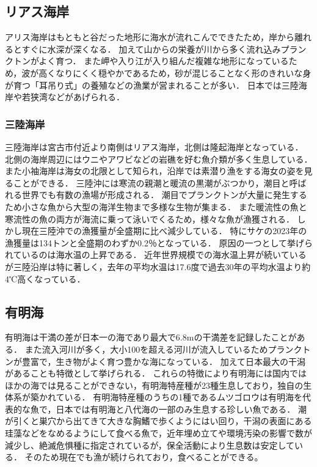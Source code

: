 \documentclass[12pt,a4j,titlepage]{ltjsarticle}
\begin{document}
\subsection{リアス海岸}
アリス海岸はもともと谷だった地形に海水が流れこんでできたため，岸から離れるとすぐに水深が深くなる．
加えて山からの栄養が川から多く流れ込みプランクトンがよく育つ．
また岬や入り江が入り組んだ複雑な地形になっているため，波が高くなりにくく穏やかであるため，砂が混じることなく形のきれいな身が育つ「耳吊り式」の養殖などの漁業が営まれることが多い．
日本では三陸海岸や若狭湾などがあげられる．
\subsubsection{三陸海岸}
三陸海岸は宮古市付近より南側はリアス海岸，北側は隆起海岸となっている\cite{sanriku}．
北側の海岸周辺にはウニやアワビなどの岩礁を好む魚介類が多く生息している．
また小袖海岸は海女の北限として知られ，沿岸では素潜り漁をする海女の姿を見ることができる．
三陸沖には寒流の親潮と暖流の黒潮がぶつかり，潮目と呼ばれる世界でも有数の漁場が形成される．
潮目でプランクトンが大量に発生するため小さな魚から大型の海洋生物まで多様な生物が集まる．
また暖流性の魚と寒流性の魚の両方が海流に乗って泳いでくるため，様々な魚が漁獲される．
しかし現在三陸沖での漁獲量が全盛期に比べ減少している．
特にサケの2023年の漁獲量は134トンと全盛期のわずか0.2％となっている．
原因の一つとして挙げられているのは海水温の上昇である．
近年世界規模での海水温上昇が続いているが三陸沿岸は特に著しく，去年の平均水温は17.6度で過去30年の平均水温より約4℃高くなっている．
\subsection{有明海}
有明海は干満の差が日本一の海であり最大で6.8mの干満差を記録したことがある\cite{ariake}．
また流入河川が多く，大小100を超える河川が流入しているためプランクトンが豊富で，生き物がよく育つ豊かな海になっている．
加えて日本最大の干潟があることも特徴として挙げられる．
これらの特徴により有明海には国内ではほかの海では見ることができない，有明海特産種が23種生息しており，独自の生体系が築かれている．
有明海特産種のうちの1種であるムツゴロウは有明海を代表的な魚で，日本では有明海と八代海の一部のみ生息する珍しい魚である．
潮が引くと巣穴から出てきて大きな胸鰭で歩くようにはい回り，干潟の表面にある珪藻などをなめるようにして食べる魚で，近年埋め立てや環境汚染の影響で数が減少し、絶滅危惧種に指定されているが，保全活動により生息数は安定している．
そのため現在でも漁が続けられており，食べることができる。
\end{document}
